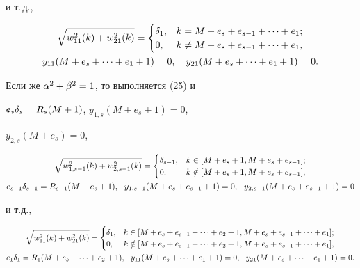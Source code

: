 и т.\,д.,


\begin{gather}


\sqrt{w_{11}^2(k)+ w_{21}^2(k)} =


\begin{cases}


 \d_1, & k = M+e_s+e_{s-1}+\dotsb+e_1;\\


 0, & k \neq M+e_s+e_{s-1}+\dotsb+e_1,


\end{cases}


\\


y_{11}(M+e_s+\dotsb+e_1+1) = 0,\quad y_{21}(M+e_s+\dotsb+e_1+1) = 0.\notag


\end{gather}


Если же $\alpha^2 + \beta^2 = 1$, то выполняется (25) и


$e_s\delta_s = R_s(M+1)$, $y_{1,s}(M+e_s+1) = 0$,


$y_{2,s}(M+e_s) = 0$,


\begin{gather}


\sqrt{w_{1,s-1}^2(k)+ w_{2,s-1}^2(k)} =


\begin{cases}


\d_{s-1},&k \in [M+e_s+1, M+e_s+e_{s-1}];\\


0,& k \notin [M+e_s+1, M + e_s+e_{s-1}],


\end{cases}


\\


%


e_{s-1}\d_{s-1} = R_{s-1}(M+e_s+1),\ \


y_{1,s-1}(M+e_s+e_{s-1}+1) = 0,\ \ y_{2,s-1}(M+e_s+e_{s-1}+1) = 0\notag


\end{gather}


и т.д.,


\begin{gather}


\sqrt{w_{11}^2(k)+ w_{21}^2(k)} =


\begin{cases}


\d_1, & k \in [M+e_s+e_{s-1}+\dotsb+e_2+1, M+e_s+e_{s-1}+\dotsb+e_1];\\


0, & k \notin [M+e_s+e_{s-1}+\dotsb+e_2+1, M+e_s+e_{s-1}+\dotsb+e_1],


\end{cases}


\\


e_1\d_1 = R_1(M+e_s+\dotsb+e_2+1),\ \ y_{11}(M+e_s+\dotsb+e_1+1) = 0,\ \


y_{21}(M+e_s+\dotsb+e_1+1) = 0.\notag


\end{gather}


